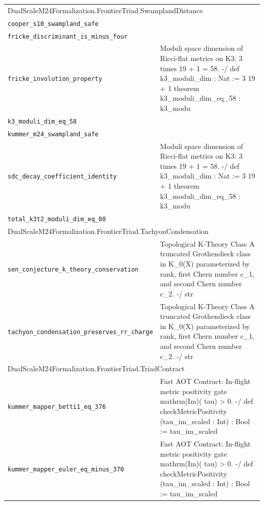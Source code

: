 \begin{longtable}{p{}p{}}
\multicolumn{2}{l}{\textsf{\small DualScaleM24Formalization.FrontierTriad.SwamplandDistance}} \\
\quad\texttt{\footnotesize cooper\_s10\_swampland\_safe} & {\footnotesize } \\
\quad\texttt{\footnotesize fricke\_discriminant\_is\_minus\_four} & {\footnotesize } \\
\quad\texttt{\footnotesize fricke\_involution\_property} & {\footnotesize Moduli space dimension of Ricci-flat metrics on K3: 3  times 19 + 1 = 58. -/ def k3\_moduli\_dim : Nat := 3 19 + 1 theorem k3\_moduli\_dim\_eq\_58 : k3\_modu} \\
\quad\texttt{\footnotesize k3\_moduli\_dim\_eq\_58} & {\footnotesize } \\
\quad\texttt{\footnotesize kummer\_m24\_swampland\_safe} & {\footnotesize } \\
\quad\texttt{\footnotesize sdc\_decay\_coefficient\_identity} & {\footnotesize Moduli space dimension of Ricci-flat metrics on K3: 3  times 19 + 1 = 58. -/ def k3\_moduli\_dim : Nat := 3 19 + 1 theorem k3\_moduli\_dim\_eq\_58 : k3\_modu} \\
\quad\texttt{\footnotesize total\_k3t2\_moduli\_dim\_eq\_80} & {\footnotesize } \\
\multicolumn{2}{l}{\textsf{\small DualScaleM24Formalization.FrontierTriad.TachyonCondensation}} \\
\quad\texttt{\footnotesize sen\_conjecture\_k\_theory\_conservation} & {\footnotesize Topological K-Theory Class A truncated Grothendieck class in K\_0(X) parameterized by rank, first Chern number c\_1, and second Chern number c\_2. -/ str} \\
\quad\texttt{\footnotesize tachyon\_condensation\_preserves\_rr\_charge} & {\footnotesize Topological K-Theory Class A truncated Grothendieck class in K\_0(X) parameterized by rank, first Chern number c\_1, and second Chern number c\_2. -/ str} \\
\multicolumn{2}{l}{\textsf{\small DualScaleM24Formalization.FrontierTriad.TriadContract}} \\
\quad\texttt{\footnotesize kummer\_mapper\_betti1\_eq\_376} & {\footnotesize Fast AOT Contract: In-flight metric positivity gate  mathrm(Im)( tau) > 0. -/ def checkMetricPositivity (tau\_im\_scaled : Int) : Bool := tau\_im\_scaled } \\
\quad\texttt{\footnotesize kummer\_mapper\_euler\_eq\_minus\_370} & {\footnotesize Fast AOT Contract: In-flight metric positivity gate  mathrm(Im)( tau) > 0. -/ def checkMetricPositivity (tau\_im\_scaled : Int) : Bool := tau\_im\_scaled } \\

\end{longtable}
